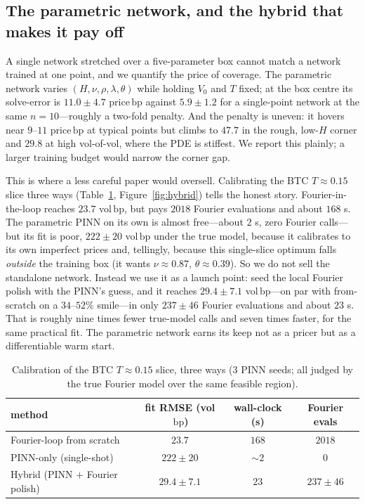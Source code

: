 \documentclass[11pt]{article}
\newcommand{\bp}{\ensuremath{\,\mathrm{bp}}}
\begin{document}
\subsection{The parametric network, and the hybrid that makes it pay off}
\label{sec:hybrid}
A single network stretched over a five-parameter box cannot match a network
trained at one point, and we quantify the price of coverage. The parametric
network varies $(H,\nu,\rho,\lambda,\theta)$ while holding $V_0$ and $T$ fixed; at
the box centre its solve-error is $11.0\pm4.7$ price\bp{} against $5.9\pm1.2$ for a
single-point network at the same $n=10$---roughly a two-fold penalty. And the
penalty is uneven: it hovers near $9$--$11$ price\bp{} at typical points but
climbs to $47.7$ in the rough, low-$H$ corner and $29.8$ at high vol-of-vol, where
the PDE is stiffest. We report this plainly; a larger training budget would narrow
the corner gap.

This is where a less careful paper would oversell. Calibrating the BTC
$T\approx0.15$ slice three ways (Table~\ref{tab:calib}, Figure~\ref{fig:hybrid})
tells the honest story. Fourier-in-the-loop reaches $23.7$ vol\bp{}, but pays
$2018$ Fourier evaluations and about $168$ s. The parametric PINN on its own is
almost free---about $2$ s, zero Fourier calls---but its fit is poor, $222\pm20$
vol\bp{} under the true model, because it calibrates to its own imperfect prices
and, tellingly, because this single-slice optimum falls \emph{outside} the
training box (it wants $\nu\approx0.87$, $\theta\approx0.39$). So we do not sell
the standalone network. Instead we use it as a launch point: seed the local
Fourier polish with the PINN's guess, and it reaches $29.4\pm7.1$ vol\bp{}---on par
with from-scratch on a $34$--$52\%$ smile---in only $237\pm46$ Fourier evaluations
and about $23$ s. That is roughly nine times fewer true-model calls and seven
times faster, for the same practical fit. The parametric network earns its keep
not as a pricer but as a differentiable warm start.

\begin{table}[t]\centering
\caption{Calibration of the BTC $T\approx0.15$ slice, three ways (3 PINN seeds;
all judged by the true Fourier model over the same feasible region).}
\label{tab:calib}
\begin{tabular}{lccc}
\toprule
method & fit RMSE (vol\bp) & wall-clock (s) & Fourier evals\\
\midrule
Fourier-loop from scratch      & $23.7$        & $168$ & $2018$\\
PINN-only (single-shot)        & $222\pm20$    & $\sim2$ & $0$\\
Hybrid (PINN $+$ Fourier polish) & $29.4\pm7.1$ & $23$  & $237\pm46$\\
\bottomrule
\end{tabular}
\end{table}
\end{document}
